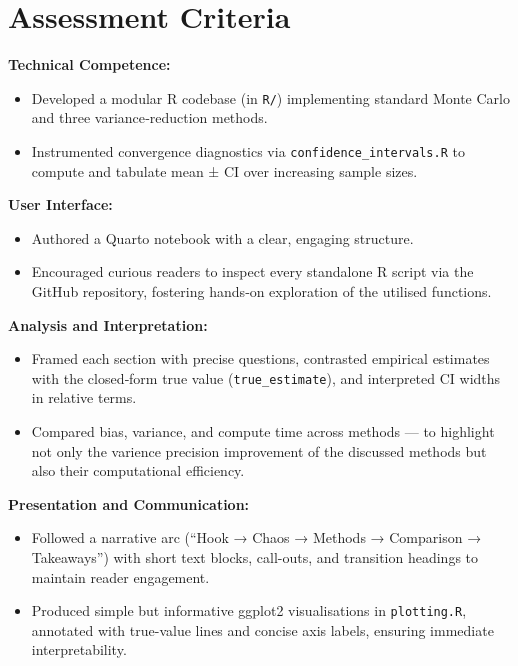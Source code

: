 \documentclass[a4paper, 12pt]{article}
\begin{document}
\pagebreak

\section{Assessment Criteria}

\textbf{Technical Competence:}
\begin{itemize}
  \item Developed a modular R codebase (in \texttt{R/}) implementing standard Monte Carlo 
  and three variance‐reduction methods.
  \item Instrumented convergence diagnostics via \texttt{confidence\_intervals.R} 
  to compute and tabulate mean ± CI over increasing sample sizes.
\end{itemize}

\textbf{User Interface:} 
\begin{itemize}
  \item Authored a Quarto notebook with a clear, engaging structure.
  \item Encouraged curious readers to inspect every standalone R script via the GitHub repository, 
  fostering hands‐on exploration of the utilised functions.
  \end{itemize}

\textbf{Analysis and Interpretation:} 
\begin{itemize}
  \item Framed each section with precise questions, 
  contrasted empirical estimates with the closed‐form true value (\texttt{true\_estimate}), 
  and interpreted CI widths in relative terms.
  \item Compared bias, variance, and compute time across methods — to
  highlight not only the varience precision improvement of the discussed methods 
  but also their computational efficiency.
\end{itemize}

\textbf{Presentation and Communication:} 
\begin{itemize}
  \item Followed a narrative arc (“Hook → Chaos → Methods → Comparison → Takeaways”) with short text blocks, 
  call-outs, and transition headings to maintain reader engagement.
  \item Produced simple but informative ggplot2 visualisations in \texttt{plotting.R}, 
  annotated with true-value lines and concise axis labels, ensuring immediate interpretability.
\end{itemize}
\end{document}
